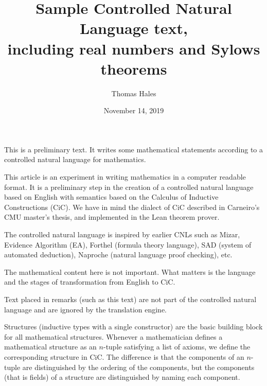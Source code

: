 \documentclass[12pt]{article}
\title{Sample Controlled Natural Language text,\\ including real numbers and Sylows theorems}
\date{November 14, 2019}
\author{Thomas Hales}
\numberwithin{definition}{section}
\begin{document}
\maketitle

\setcounter{tocdepth}{1}
\tableofcontents
\newpage




\begin{cnl}


\CnlCustom{}
\CnlCustom{}




\begin{remark}
This is a preliminary text.  It
writes some mathematical statements according to a
controlled natural language for mathematics.
\end{remark}



\begin{remark}
This article is an experiment in writing mathematics in a computer
readable format.  It is a preliminary step in the creation of a
controlled natural language based on English with semantics based on
the Calculus of Inductive Constructions (CiC).  We have in mind the
dialect of CiC described in Carneiro's CMU master's thesis, and
implemented in the Lean theorem prover.

The controlled natural language is inspired by earlier CNLs such as
Mizar, Evidence Algorithm (EA), Forthel (formula theory language), SAD
(system of automated deduction), Naproche (natural language proof
checking), etc.

The mathematical content here is not important.  What matters is the
language and the stages of transformation from English to CiC.

Text placed in remarks (such as this text) are not part of the
controlled natural language and are ignored by the translation engine.
\end{remark}




\begin{remark}
Structures (inductive types with a single constructor) are the basic
building block for all mathematical structures. Whenever a
mathematician defines a mathematical structure as an $n$-tuple
satisfying a list of axioms, we define the corresponding
structure in CiC. The difference is that the components of an
$n$-tuple are distinguished by the ordering of the components, but the
components (that is fields) of a structure are distinguished by naming
each component.


\end{remark}
\end{cnl}
\end{document}
